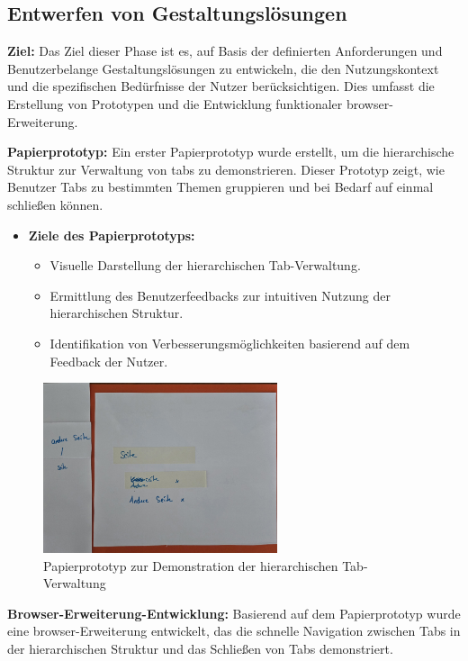 \subsection{Entwerfen von Gestaltungslösungen}

\textbf{Ziel:}
Das Ziel dieser Phase ist es, auf Basis der definierten Anforderungen und Benutzerbelange Gestaltungslösungen zu entwickeln, die den Nutzungskontext und die spezifischen Bedürfnisse der Nutzer berücksichtigen. 
Dies umfasst die Erstellung von Prototypen und die Entwicklung funktionaler \gls{browser}-Erweiterung.

\textbf{Papierprototyp:}
Ein erster Papierprototyp wurde erstellt, um die hierarchische Struktur zur Verwaltung von \gls{tab}s zu demonstrieren. Dieser Prototyp zeigt, wie Benutzer Tabs zu bestimmten Themen gruppieren und bei Bedarf auf einmal schließen können.

\begin{itemize}
    \item \textbf{Ziele des Papierprototyps:}
    \begin{itemize}
        \item Visuelle Darstellung der hierarchischen Tab-Verwaltung.
        \item Ermittlung des Benutzerfeedbacks zur intuitiven Nutzung der hierarchischen Struktur.
        \item Identifikation von Verbesserungsmöglichkeiten basierend auf dem Feedback der Nutzer.
    \end{itemize}
\end{itemize}

\begin{figure}[H]
    \caption{Papierprototyp zur Demonstration der hierarchischen Tab-Verwaltung}
    \includegraphics[height=5cm]{abbildungen/papierprototyp.jpg}
\end{figure}


\textbf{Browser-Erweiterung-Entwicklung:}
Basierend auf dem Papierprototyp wurde eine \gls{browser}-Erweiterung entwickelt, das die schnelle Navigation zwischen Tabs in der hierarchischen Struktur und das Schließen von Tabs demonstriert.

